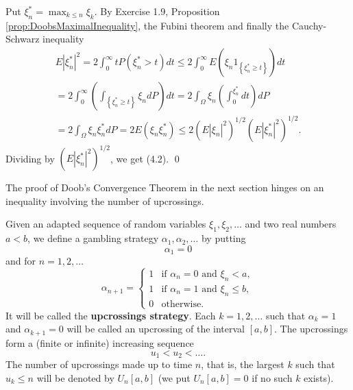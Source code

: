 \begin{Proof}
Put $\xi_{n}^{*} = \max_{k\leq n}\xi_{k}$. By Exercise 1.9, Proposition \ref{prop:DoobsMaximalInequality}, the Fubini theorem and finally the Cauchy-Schwarz inequality
\[
\begin{array}{l}
E \left| \xi_{n}^{*} \right|^{2} = 2 \int_{0}^{\infty} t P \left(\xi_{n}^{*} > t\right) dt \leq 2 \int_{0}^{\infty} E \left(\xi_{n} 1_{\left\{\xi_{n}^{*} \geq t \right\}}\right) dt \\
= 2 \int_{0}^{\infty} \left(\int_{\left\{\xi_{n}^{*} \geq t \right\}} \xi_{n} dP\right) dt = 2 \int_{\Omega} \xi_{n} \left(\int_{0}^{\xi_{n}^{*}} dt\right) dP \\
= 2 \int_{\Omega} \xi_{n} \xi_{n}^{*} dP = 2 E (\xi_{n} \xi_{n}^{*}) \leq 2 (E | \xi_{n} |^{2})^{1/2} (E | \xi_{n}^{*} |^{2})^{1/2}.
\end{array}
\]
Dividing by $\left(E|\xi_n^*|^2\right)^{1/2}$, we get (4.2).
\qed
\end{Proof}

The proof of Doob's Convergence Theorem in the next section hinges on an inequality involving the number of upcrossings.

\begin{Definition}
\label{def:UpcrossingsStrategy}
Given an adapted sequence of random variables $\xi_1, \xi_2, \ldots$ and two real numbers $a < b$, we define a gambling strategy $\alpha_1, \alpha_2, \ldots$ by putting
\[
\alpha_{1} = 0
\]
and for $n = 1,2,\ldots$
\[
\alpha_{n + 1} = \left\{ \begin{array}{ll}
1 & \text{if } \alpha_{n} = 0 \text{ and } \xi_{n} < a, \\
1 & \text{if } \alpha_{n} = 1 \text{ and } \xi_{n} \leq b, \\
0 & \text{otherwise.}
\end{array} \right.
\]
It will be called the \textbf{upcrossings strategy}. Each $k = 1,2,\ldots$ such that $\alpha_{k} = 1$ and $\alpha_{k + 1} = 0$ will be called an upcrossing of the interval $[a,b]$. The upcrossings form a (finite or infinite) increasing sequence
\[
u_{1} < u_{2} < \dots .
\]
The number of upcrossings made up to time $n$, that is, the largest $k$ such that $u_{k} \leq n$ will be denoted by $U_{n}[a,b]$ (we put $U_{n}[a,b] = 0$ if no such $k$ exists).
\end{Definition}

